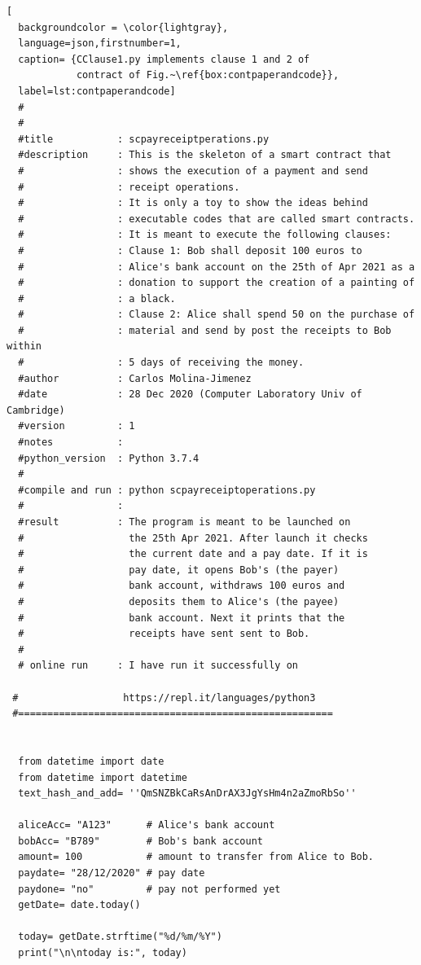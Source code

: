 \documentclass[12pt]{report} %
\begin{document}
\begin{lstlisting}[
  backgroundcolor = \color{lightgray},
  language=json,firstnumber=1,
  caption= {CClause1.py implements clause 1 and 2 of 
            contract of Fig.~\ref{box:contpaperandcode}},
  label=lst:contpaperandcode]
  #
  #
  #title           : scpayreceiptperations.py
  #description     : This is the skeleton of a smart contract that
  #                : shows the execution of a payment and send
  #                : receipt operations.
  #                : It is only a toy to show the ideas behind
  #                : executable codes that are called smart contracts.
  #                : It is meant to execute the following clauses:
  #                : Clause 1: Bob shall deposit 100 euros to
  #                : Alice's bank account on the 25th of Apr 2021 as a
  #                : donation to support the creation of a painting of
  #                : a black.
  #                : Clause 2: Alice shall spend 50 on the purchase of
  #                : material and send by post the receipts to Bob within
  #                : 5 days of receiving the money.
  #author          : Carlos Molina-Jimenez
  #date            : 28 Dec 2020 (Computer Laboratory Univ of Cambridge)
  #version         : 1
  #notes           :
  #python_version  : Python 3.7.4
  #
  #compile and run : python scpayreceiptoperations.py
  #                :
  #result          : The program is meant to be launched on
  #                  the 25th Apr 2021. After launch it checks
  #                  the current date and a pay date. If it is
  #                  pay date, it opens Bob's (the payer)
  #                  bank account, withdraws 100 euros and
  #                  deposits them to Alice's (the payee)
  #                  bank account. Next it prints that the
  #                  receipts have sent sent to Bob.
  #
  # online run     : I have run it successfully on

 #                  https://repl.it/languages/python3
 #======================================================
  
  
  from datetime import date
  from datetime import datetime
  text_hash_and_add= ''QmSNZBkCaRsAnDrAX3JgYsHm4n2aZmoRbSo''

  aliceAcc= "A123"      # Alice's bank account
  bobAcc= "B789"        # Bob's bank account
  amount= 100           # amount to transfer from Alice to Bob.
  paydate= "28/12/2020" # pay date
  paydone= "no"         # pay not performed yet
  getDate= date.today()
  
  today= getDate.strftime("%d/%m/%Y")
  print("\n\ntoday is:", today)
 

\end{lstlisting}
\end{document}
